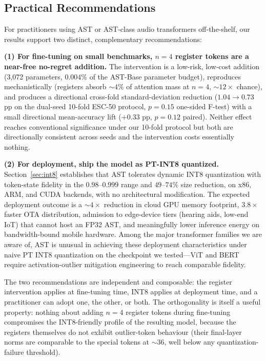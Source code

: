 \documentclass[conference]{IEEEtran}
\begin{document}
\subsection{Practical Recommendations}

For practitioners using AST or AST-class audio transformers off-the-shelf, our results support two distinct, complementary recommendations:

\textbf{(1) For fine-tuning on small benchmarks, $n{=}4$ register tokens are a near-free no-regret addition.} The intervention is a low-risk, low-cost addition (3{,}072 parameters, $0.004\%$ of the AST-Base parameter budget), reproduces mechanistically (registers absorb $\sim 4\%$ of attention mass at $n{=}4$, $\sim 12\times$ chance), and produces a directional cross-fold standard-deviation reduction ($1.04 \to 0.73$ pp on the dual-seed 10-fold ESC-50 protocol, $p=0.15$ one-sided F-test) with a small directional mean-accuracy lift ($+0.33$ pp, $p=0.12$ paired). Neither effect reaches conventional significance under our 10-fold protocol but both are directionally consistent across seeds and the intervention costs essentially nothing.

\textbf{(2) For deployment, ship the model as PT-INT8 quantized.} Section~\ref{sec:int8} establishes that AST tolerates dynamic INT8 quantization with token-state fidelity in the $0.98$--$0.999$ range and $49$--$74\%$ size reduction, on x86, ARM, and CUDA backends, with no architectural modification. The expected deployment outcome is a $\sim 4\times$ reduction in cloud GPU memory footprint, $3.8\times$ faster OTA distribution, admission to edge-device tiers (hearing aids, low-end IoT) that cannot host an FP32 AST, and meaningfully lower inference energy on bandwidth-bound mobile hardware. Among the major transformer families we are aware of, AST is unusual in achieving these deployment characteristics under naive PT INT8 quantization on the checkpoint we tested---ViT and BERT require activation-outlier mitigation engineering to reach comparable fidelity.

The two recommendations are independent and composable: the register intervention applies at fine-tuning time, INT8 applies at deployment time, and a practitioner can adopt one, the other, or both. The orthogonality is itself a useful property: nothing about adding $n{=}4$ register tokens during fine-tuning compromises the INT8-friendly profile of the resulting model, because the registers themselves do not exhibit outlier-token behaviour (their final-layer norms are comparable to the special tokens at $\sim 36$, well below any quantization-failure threshold).
\end{document}
